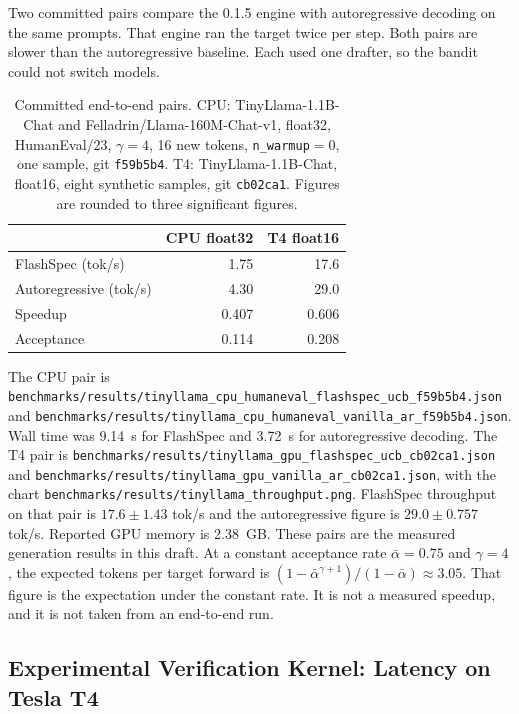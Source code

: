 \documentclass[11pt]{article}
\begin{document}
Two committed pairs compare the 0.1.5 engine with autoregressive decoding
on the same prompts.
That engine ran the target twice per step.
Both pairs are slower than the autoregressive baseline.
Each used one drafter, so the bandit could not switch models.

\begin{table}[t]
\centering
\caption{%
  Committed end-to-end pairs.
  CPU: TinyLlama-1.1B-Chat and Felladrin/Llama-160M-Chat-v1, float32,
  HumanEval/23, $\gamma=4$, 16 new tokens, \texttt{n\_warmup}$=0$,
  one sample, git \texttt{f59b5b4}.
  T4: TinyLlama-1.1B-Chat, float16, eight synthetic samples, git
  \texttt{cb02ca1}.
  Figures are rounded to three significant figures.
}
\label{tab:measured}
\begin{tabular}{lrr}
  \toprule
  & CPU float32 & T4 float16 \\
  \midrule
  FlashSpec (tok/s) & 1.75 & 17.6 \\
  Autoregressive (tok/s) & 4.30 & 29.0 \\
  Speedup & 0.407 & 0.606 \\
  Acceptance & 0.114 & 0.208 \\
  \bottomrule
\end{tabular}
\end{table}

The CPU pair is
\texttt{benchmarks/results/tinyllama\_cpu\_humaneval\_flashspec\_ucb\_f59b5b4.json}
and
\texttt{benchmarks/results/tinyllama\_cpu\_humaneval\_vanilla\_ar\_f59b5b4.json}.
Wall time was 9.14~s for FlashSpec and 3.72~s for autoregressive decoding.
The T4 pair is
\texttt{benchmarks/results/tinyllama\_gpu\_flashspec\_ucb\_cb02ca1.json}
and
\texttt{benchmarks/results/tinyllama\_gpu\_vanilla\_ar\_cb02ca1.json},
with the chart \texttt{benchmarks/results/tinyllama\_throughput.png}.
FlashSpec throughput on that pair is $17.6 \pm 1.43$ tok/s and the
autoregressive figure is $29.0 \pm 0.757$ tok/s.
Reported GPU memory is 2.38~GB.
These pairs are the measured generation results in this draft.
At a constant acceptance rate $\bar{\alpha}=0.75$ and $\gamma=4$, the
expected tokens per target forward is
$(1 - \bar{\alpha}^{\gamma+1}) / (1 - \bar{\alpha}) \approx 3.05$.
That figure is the expectation under the constant rate.
It is not a measured speedup, and it is not taken from an end-to-end run.

\subsection{Experimental Verification Kernel: Latency on Tesla T4}
\label{sec:kernelbench}
\end{document}
